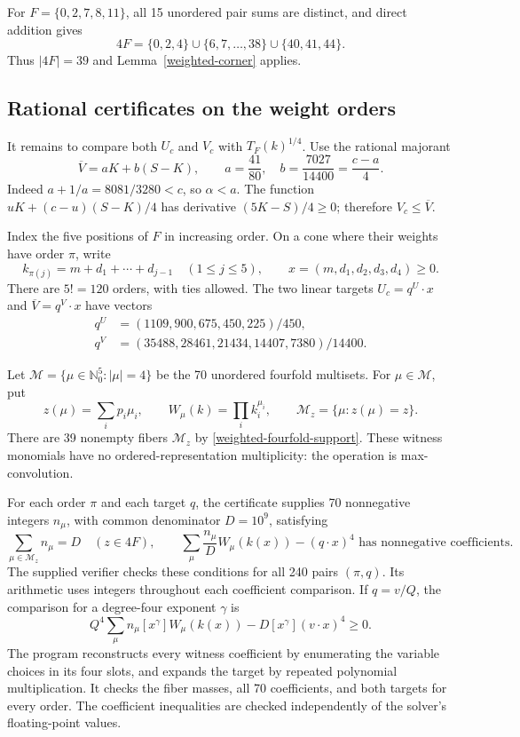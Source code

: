 For $F=\{0,2,7,8,11\}$, all 15 unordered pair sums are distinct,
and direct addition gives
\begin{equation}\label{weighted-fourfold-support}
 4F=\{0,2,4\}\cup\{6,7,\ldots,38\}\cup\{40,41,44\}.
\end{equation}
Thus $|4F|=39$ and Lemma~\ref{weighted-corner} applies.

\subsection{Rational certificates on the weight orders}

It remains to compare both $U_c$ and $V_c$ with $T_F(k)^{1/4}$.
Use the rational majorant
\[
 \overline V=aK+b(S-K),\qquad
 a=\frac{41}{80},\quad b=\frac{7027}{14400}=\frac{c-a}{4}.
\]
Indeed $a+1/a=8081/3280<c$, so $\alpha<a$. The function
$uK+(c-u)(S-K)/4$ has derivative $(5K-S)/4\ge0$;
therefore $V_c\le\overline V$.

Index the five positions of $F$ in increasing order. On a cone where
their weights have order $\pi$, write
\[
 k_{\pi(j)}=m+d_1+\cdots+d_{j-1}\quad(1\le j\le5),
 \qquad x=(m,d_1,d_2,d_3,d_4)\ge0.
\]
There are $5!=120$ orders, with ties allowed. The two linear targets
$U_c=q^U\cdot x$ and $\overline V=q^V\cdot x$ have vectors
\begin{align*}
 q^U&=(1109,900,675,450,225)/450,\\
 q^V&=(35488,28461,21434,14407,7380)/14400.
\end{align*}

Let $\mathcal M=\{\mu\in\mathbb N_0^5:|\mu|=4\}$ be the 70
unordered fourfold multisets. For $\mu\in\mathcal M$, put
\[
 z(\mu)=\sum_i p_i\mu_i,\qquad W_\mu(k)=\prod_i k_i^{\mu_i},
 \qquad \mathcal M_z=\{\mu:z(\mu)=z\}.
\]
There are 39 nonempty fibers $\mathcal M_z$ by
\eqref{weighted-fourfold-support}. These witness monomials have no
ordered-representation multiplicity: the operation is max-convolution.

For each order $\pi$ and each target $q$, the certificate supplies 70
nonnegative integers $n_\mu$, with common denominator $D=10^9$,
satisfying
\begin{equation}\label{weighted-certificate}
 \sum_{\mu\in\mathcal M_z}n_\mu=D\quad(z\in4F),\qquad
 \sum_\mu\frac{n_\mu}{D}W_\mu(k(x))-(q\cdot x)^4
 \text{ has nonnegative coefficients.}
\end{equation}
The supplied verifier checks these conditions for all 240 pairs
$(\pi,q)$. Its arithmetic uses integers throughout each coefficient
comparison. If $q=v/Q$, the comparison for a degree-four exponent
$\gamma$ is
\[
 Q^4\sum_\mu n_\mu[x^\gamma]W_\mu(k(x))
       -D[x^\gamma](v\cdot x)^4\ge0.
\]
The program reconstructs every witness coefficient by enumerating the
variable choices in its four slots, and expands the target by repeated
polynomial multiplication. It checks the fiber masses, all 70 coefficients,
and both targets for every order. The coefficient inequalities are checked
independently of the solver's floating-point values.

